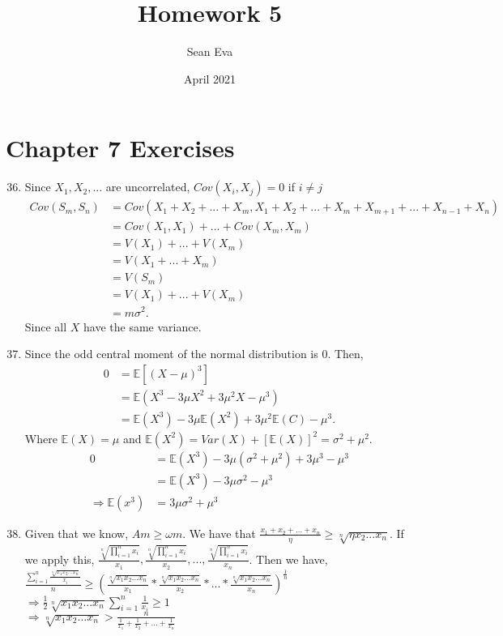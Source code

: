 \documentclass{article}
\title{Homework 5}
\author{Sean Eva}
\date{April 2021}
\begin{document}
\maketitle

\section{Chapter 7 Exercises}

\begin{enumerate}
    \setcounter{enumi}{35}
    \item 
    
    Since $X_1, X_2,...$ are uncorrelated, $Cov(X_i, X_j)=0$ if $i\neq j$
    \begin{align*}
        Cov(S_m,S_n) &= Cov(X_1+X_2+...+X_m, X_1+X_2+...+X_m+X_{m+1}+...+X_{n-1}+X_n)\\
        &= Cov(X_1,X_1)+...+Cov(X_m,X_m)\\
        &= V(X_1)+...+V(X_m)\\
        &= V(X_1+...+X_m)\\
        &= V(S_m)\\
        &= V(X_1)+...+V(X_m)\\
        &= m\sigma^2.
    \end{align*} Since all $X$ have the same variance.
    
    \setcounter{enumi}{59}
    \item
    
    Since the odd central moment of the normal distribution is $0$. Then,
    \begin{align*}
        0 &= \mathbb{E}[(X-\mu)^3]\\
        &= \mathbb{E}(X^3-3\mu X^2+3\mu^2X-\mu^3)\\
        &= \mathbb{E}(X^3)-3\mu\mathbb{E}(X^2)+3\mu^2\mathbb{E}(C)-\mu^3.
    \end{align*} Where $\mathbb{E}(X)=\mu$ and $\mathbb{E}(X^2)=Var(X)+[\mathbb{E}(X)]^2=\sigma^2+\mu^2$.
    \begin{align*}
        0 &= \mathbb{E}(X^3)-3\mu(\sigma^2+\mu^2)+3\mu^3-\mu^3\\
        &= \mathbb{E}(X^3)-3\mu\sigma^2-\mu^3\\
        \Rightarrow \mathbb{E}(x^3)&=3\mu\sigma^2+\mu^3
    \end{align*}
    
    \setcounter{enumi}{74}
    \item
    
    Given that we know, $Am\geq \omega m$. We have that $\frac{x_1+x_2+...+x_n}{\eta}\geq \sqrt[n]{\eta x_2...x_n}$. If we apply this, $\frac{\sqrt[n]{\prod_{i=1}^nx_i}}{x_1}, \frac{\sqrt[n]{\prod_{i=1}^nx_i}}{x_2}, ..., \frac{\sqrt[n]{\prod_{i=1}^nx_i}}{x_n}$. Then we have, $\frac{\sum_{i=1}^n\frac{\sqrt[n]{x_1x_2...x_n}}{x_i}}{n}\geq(\frac{\sqrt[n]{x_1x_2...x_n}}{x_1}*\frac{\sqrt[n]{x_1x_2...x_n}}{x_2}*...*\frac{\sqrt[n]{x_1x_2...x_n}}{x_n})^{\frac{1}{n}}$\\
    $\Rightarrow \frac{1}{2} \sqrt[n]{x_1x_2...x_n}\sum_{i=1}^n\frac{1}{x_i}\geq 1$\\
    $\Rightarrow \sqrt[n]{x_1x_2...x_n} > \frac{n}{\frac{1}{x_1}+\frac{1}{x_2}+...+\frac{1}{x_n}}$
    

\end{enumerate}
\end{document}
